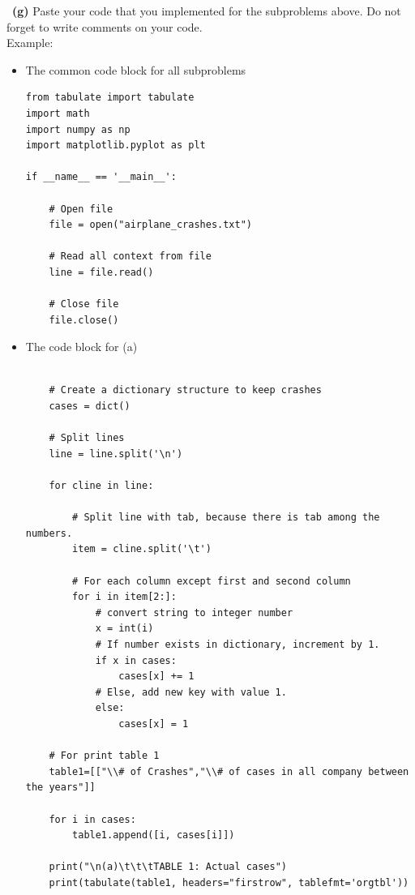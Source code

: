 \documentclass[a4 paper]{article}
\numberwithin{equation}{section}
\newcommand{\subproblem}[1]{~\newline\textbf{(#1)}}
\newcommand{\0}{\mathbf{0}}
\begin{document}
\newpage
\subproblem{g} Paste your code that you implemented for the subproblems above. Do not forget to write comments on your code.\\
Example:\\
\begin{itemize}
	\item The common code block for all subproblems\\
	
	\begin{lstlisting}[label={list:first},caption=The common code - Import modules and File operations]
from tabulate import tabulate
import math
import numpy as np
import matplotlib.pyplot as plt

if __name__ == '__main__':

	# Open file
	file = open("airplane_crashes.txt")

	# Read all context from file
	line = file.read()
	
	# Close file
	file.close()
    \end{lstlisting}
	
	\item The code block for (a)\\
	
		\begin{lstlisting}[label={list:first},caption=The code block a - Compute the values in Table 1 and Print table]
	
	# Create a dictionary structure to keep crashes
	cases = dict()

	# Split lines
	line = line.split('\n')

	for cline in line:

		# Split line with tab, because there is tab among the numbers.
		item = cline.split('\t')

		# For each column except first and second column
		for i in item[2:]:
			# convert string to integer number
			x = int(i)
			# If number exists in dictionary, increment by 1.
			if x in cases:
				cases[x] += 1
			# Else, add new key with value 1.
			else:
				cases[x] = 1

	# For print table 1
	table1=[["\\# of Crashes","\\# of cases in all company between the years"]]

	for i in cases:
		table1.append([i, cases[i]])

	print("\n(a)\t\t\tTABLE 1: Actual cases")
	print(tabulate(table1, headers="firstrow", tablefmt='orgtbl'))
\end{lstlisting}
	

\end{itemize}
\end{document}
